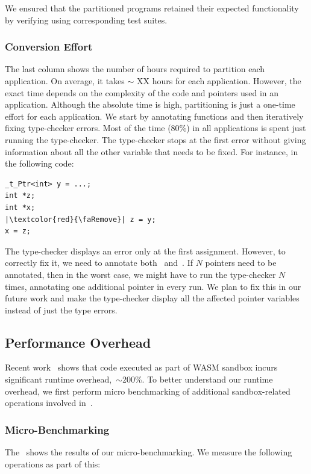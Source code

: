 We ensured that the partitioned programs retained their expected functionality by verifying using corresponding test suites.

\subsubsection{Conversion Effort}
The last column shows the number of hours required to partition each application.
On average, it takes $\sim$ XX hours for each application. However, the exact time depends on the complexity of the code and pointers used in an application.
Although the absolute time is high, partitioning is just a one-time effort for each application.
We start by annotating functions and then iteratively fixing type-checker errors.
Most of the time (80\%) in all applications is spent just running the type-checker.
The type-checker stops at the first error without giving information about all the other variable that needs to be fixed. 
For instance, in the following code:
\begin{verbatim}
_t_Ptr<int> y = ...; 
int *z;
int *x;
|\textcolor{red}{\faRemove}| z = y;
x = z;
\end{verbatim}
The type-checker displays an error only at the first assignment.
However, to correctly fix it, we need to annotate both~ and~.
If $N$ pointers need to be annotated, then in the worst case, we might have to run the type-checker $N$ times, annotating one additional pointer in every run.
We plan to fix this in our future work and make the type-checker display all the affected pointer variables instead of just the type errors.

\subsection{Performance Overhead}
Recent work~\cite{jangda2019not} shows that code executed as part of WASM sandbox incurs significant runtime overhead,~\ie$\sim$200\%.
To better understand our runtime overhead, we first perform micro benchmarking of additional sandbox-related operations involved in~\systemname{}.

\subsubsection{Micro-Benchmarking}
The~ shows the results of our micro-benchmarking.
We measure the following operations as part of this:

